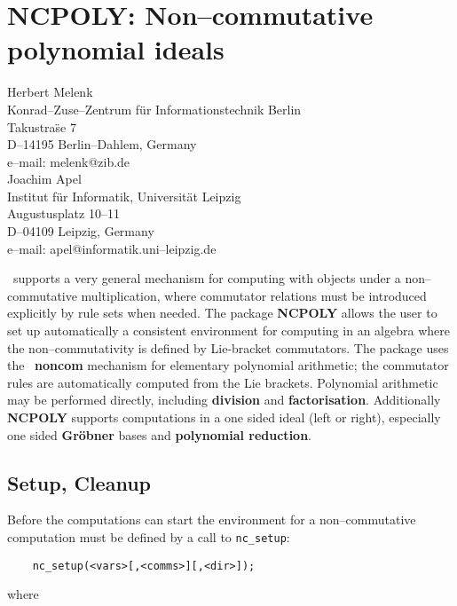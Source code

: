 \chapter[NCPOLY: Ideals in non--comm case]%
{NCPOLY: Non--commutative polynomial ideals}
\label{NCPOLY}

{\footnotesize
\begin{center}
Herbert Melenk\\
Konrad--Zuse--Zentrum f\"ur Informationstechnik Berlin \\
Takustra\"se 7 \\
D--14195 Berlin--Dahlem, Germany \\[0.05in]
e--mail:  melenk@zib.de \\[0.1in]
Joachim Apel\\
Institut f\"ur Informatik, Universit\"at Leipzig \\
Augustusplatz 10--11\\
D--04109 Leipzig, Germany \\[0.05in]
e--mail:  apel@informatik.uni--leipzig.de
\end{center}
}

\REDUCE\ supports a very general mechanism for computing with objects
under a non--commutative multiplication, where commutator relations
must be introduced explicitly by rule sets when needed.  The package
{\bf NCPOLY} allows the user to set up automatically a consistent
environment for computing in an algebra where the non--commutativity
is defined by Lie-bracket commutators.  The package uses the \REDUCE\
{\bf noncom} mechanism for elementary polynomial arithmetic; the
commutator rules are automatically computed from the Lie brackets.
Polynomial arithmetic may be performed directly, including {\bf
division} and {\bf factorisation}.  Additionally {\bf NCPOLY} supports
computations in a one sided ideal (left or right), especially one
sided {\bf Gr\"obner} bases and {\bf polynomial reduction}.

\section{Setup, Cleanup}

Before the computations can start the environment for a
non--commutative computation must be defined by a
call to {\tt nc\_setup}:
\begin{verbatim}
    nc_setup(<vars>[,<comms>][,<dir>]);
\end{verbatim}
where


